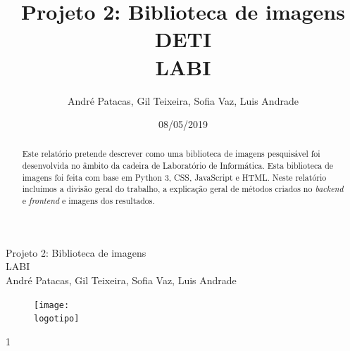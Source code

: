 \documentclass{report}
\begin{document}
%
\def\titulo{Projeto 2: Biblioteca de imagens}
\def\data{08/05/2019}
\def\autores{André Patacas, Gil Teixeira, Sofia Vaz, Luis Andrade}
\def\autorescontactos{(93357) andrepatacas@ua.pt, (88194) gilteixeira@ua.pt, (92968) sofiateixeiravaz@ua.pt, (93159) luisnunoferreirap.a@ua.pt}
\def\versao{1}
\def\departamento{DETI}
\def\empresa{LABI}
\def\logotipo{ua.pdf}

%
%
\begin{titlepage}

\begin{center}
\centering
%
\vspace*{50mm}
%
{\Huge \titulo}\\ 
%
\vspace{10mm}
%
{\Large \empresa}\\
%
\vspace{10mm}
%
{\large \autores}\\ 
%
\vspace{30mm}
%
\begin{figure}[h]
\centering
\texttt{[image: \\logotipo]}
\end{figure}
%
\vspace{30mm}
\end{center}
%
\begin{flushright}
\versao
\end{flushright}
\end{titlepage}

\title{%
{\Huge\textbf{\titulo}}\\
{\Large \departamento\\ \empresa}
}
%
\author{%
    \autores 
}
%
\date{\data}
%
\maketitle



\begin{abstract}
Este relatório pretende descrever como uma biblioteca de imagens pesquisável foi desenvolvida no âmbito da cadeira de Laboratório de Informática. Esta biblioteca de imagens foi feita com base em Python 3, CSS, JavaScript e HTML. Neste relatório incluímos a divisão geral do trabalho, a explicação geral de métodos criados no \textit{backend} e \textit{frontend} e imagens dos resultados. 
\end{abstract}
\end{document}
